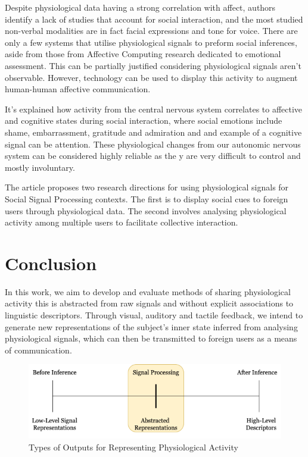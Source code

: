 Despite physiological data having a strong correlation with affect, authors identify a lack of studies that account for social interaction, and the most studied non-verbal modalities are in fact facial expressions and tone for voice. There are only a few systems that utilise physiological signals to preform social inferences, aside from those from Affective Computing research dedicated to emotional assessment. This can be partially justified considering physiological signals aren't observable. However, technology can be used to display this activity to augment human-human affective communication. 

It's explained how activity from the central nervous system correlates to affective and cognitive states during social interaction, where social emotions include shame, embarrassment, gratitude and admiration and and example of a cognitive signal can be attention. These physiological changes from our autonomic nervous system can be considered highly reliable as the y are very difficult to control and mostly involuntary. 

The article proposes two research directions for using physiological signals for Social Signal Processing contexts. The first is to display social cues to foreign users through physiological data. The second involves analysing physiological activity among multiple users to facilitate collective interaction. 

\section{Conclusion}
\label{lit_review:conclusion}

In this work, we aim to develop and evaluate methods of sharing physiological activity this is abstracted from raw signals and without explicit associations to linguistic descriptors. Through visual, auditory and tactile feedback, we intend to generate new representations of the subject's inner state inferred from analysing physiological signals, which can then be transmitted to foreign users as a means of communication.  

\begin{figure}[htbp]
	\centering
	\includegraphics[width=1.0\textwidth]{Chapters/Figures/Abstracted_Representations.png}
	\caption{Types of Outputs for Representing Physiological Activity}
	\label{fig:Abstracted_Representations}
\end{figure}

